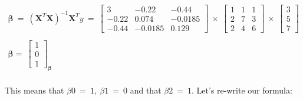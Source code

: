 \documentclass[10pt]{article}
\begin{document}
\begin{gather*}
\\
\\
\boldsymbol{\beta} \ =\ \left( \boldsymbol{X}^{T} \boldsymbol{X}\right)^{-1} \boldsymbol{X}^{T} y\ =\ \begin{bmatrix}
3 & -0.22 & -0.44\\
-0.22 & 0.074 & -0.0185\\
-0.44 & -0.0185 & 0.129
\end{bmatrix} \ \times \ \begin{bmatrix}
1 & 1 & 1\\
2 & 7 & 3\\
2 & 4 & 6
\end{bmatrix} \ \times \ \begin{bmatrix}
3\\
5\\
7
\end{bmatrix} \ \\
\\
\boldsymbol{\beta} =\ \begin{bmatrix}
1\\
0\\
1
\end{bmatrix}_{\boldsymbol{\beta}}\\
\end{gather*}

This means that $\displaystyle \beta 0\ =\ 1,\ \beta 1\ =\ 0$ and that $\displaystyle \beta 2\ =\ 1$. Let's re-write our formula:
\end{document}
